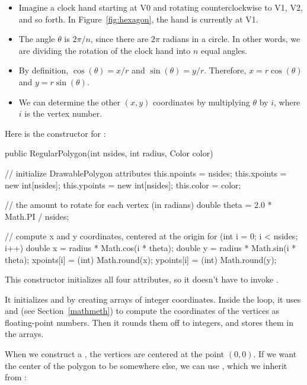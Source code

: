\begin{itemize}

\item Imagine a clock hand starting at V0 and rotating counterclockwise to V1, V2, and so forth.
In Figure~\ref{fig:hexagon}, the hand is currently at V1.

\item The angle $\theta$ is $2 \pi / n$, since there are $2\pi$ radians in a circle.
In other words, we are dividing the rotation of the clock hand into $n$ equal angles.

\item By definition, $\cos(\theta) = x/r$ and $\sin(\theta) = y/r$.
Therefore, $x = r \cos(\theta)$ and $y = r \sin(\theta)$.

\item We can determine the other $(x, y)$ coordinates by multiplying $\theta$ by $i$, where $i$ is the vertex number.

\end{itemize}

Here is the constructor for :

\begin{code}
public RegularPolygon(int nsides, int radius, Color color) {

    // initialize DrawablePolygon attributes
    this.npoints = nsides;
    this.xpoints = new int[nsides];
    this.ypoints = new int[nsides];
    this.color = color;

    // the amount to rotate for each vertex (in radians)
    double theta = 2.0 * Math.PI / nsides;

    // compute x and y coordinates, centered at the origin
    for (int i = 0; i < nsides; i++) {
        double x = radius * Math.cos(i * theta);
        double y = radius * Math.sin(i * theta);
        xpoints[i] = (int) Math.round(x);
        ypoints[i] = (int) Math.round(y);
    }
}
\end{code}

This constructor initializes all four  attributes, so it doesn't have to invoke .

It initializes  and  by creating arrays of integer coordinates.
Inside the  loop, it uses  and  (see Section~\ref{mathmeth}) to compute the coordinates of the vertices as floating-point numbers.
Then it rounds them off to integers, and stores them in the arrays.

When we construct a , the vertices are centered at the point $(0, 0)$.
If we want the center of the polygon to be somewhere else, we can use , which we inherit from :

